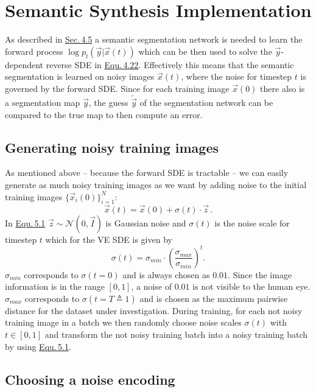 \section{Semantic Synthesis Implementation} \label{sec:5.2}
As described in \hyperref[sec:4.5]{Sec.\,4.5} a semantic segmentation network is needed to learn the forward process $\log p_t(\vec{y}|\vec{x}(t))$ which can be then used to solve the $\vec{y}$-dependent reverse SDE in \hyperref[equ:4.22]{Equ.\,4.22}. Effectively this means that the semantic segmentation is learned on noisy images $\vec{x}(t)$, where the noise for timestep $t$ is governed by the forward SDE. Since for each training image $\vec{x}(0)$ there also is a segmentation map $\vec{y}$, the guess $\tilde{\vec{y}}$ of the segmentation network can be compared to the true map to then compute an error. 

\subsection{Generating noisy training images}

As mentioned above – because the forward SDE is tractable – we can easily generate as much noisy training images as we want by adding noise to the initial training images $\{\vec{x}_i(0)\}_{i=1}^N$:
%
\begin{equation} \label{equ:5.1}
    \vec{x}(t)=\vec{x}(0)+\sigma(t)\cdot\vec{z}\,.
\end{equation}
%
In \hyperref[equ:5.1]{Equ.\,5.1} $\vec{z}\sim\mathcal{N}(0, \vec{I})$ is Gaussian noise and $\sigma(t)$ is the noise scale for timestep $t$ which for the VE SDE is given by
%
\begin{equation} \label{5.2}
    \sigma(t)=\sigma_{min}\cdot\left(\frac{\sigma_{max}}{\sigma_{min}}\right)^t.
\end{equation}
%
$\sigma_{min}$ corresponds to $\sigma(t=0)$ and is always chosen as $0.01$. Since the image information is in the range $[0,1]$, a noise of $0.01$ is not visible to the human eye. $\sigma_{max}$ corresponds to $\sigma(t=T\triangleq1)$ and is chosen as the maximum pairwise distance for the dataset under investigation. During training, for each not noisy training image in a batch we then randomly choose noise scales $\sigma(t)$ with $t\in[0,1]$ and transform the not noisy training batch into a noisy training batch by using \hyperref[equ:5.1]{Equ.\,5.1}.

\subsection{Choosing a noise encoding}

